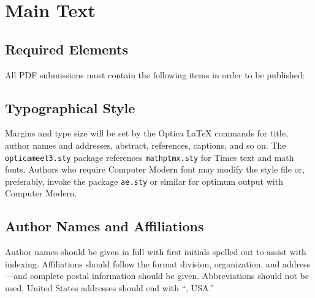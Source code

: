 \documentclass[letterpaper, 10pt]{article}
\begin{document}
\section{Main Text}

\subsection{Required Elements}
All PDF submissions must contain the following items in order to be published:


\subsection{Typographical Style}
Margins and type size will be set by the Optica \LaTeX{}
commands for title, author names and addresses, abstract,
references, captions, and so on. The \texttt{opticameet3.sty} package
references \texttt{mathptmx.sty} for Times text and math fonts.
Authors who require Computer Modern font may modify the style file
or, preferably, invoke the package \texttt{ae.sty} or similar for
optimum output with Computer Modern.

\subsection{Author Names and Affiliations}
Author names should be given in full with first initials spelled out to assist with indexing.
Affiliations should follow the format division, organization, and address---and complete postal information should be given.
Abbreviations should not be used. United States addresses should end
with ``, USA.''
\end{document}
